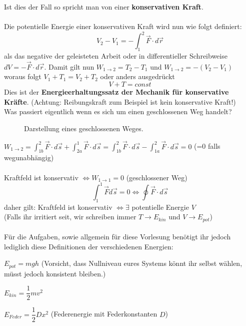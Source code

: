 \documentclass[12pt]{article}
\begin{document}
Ist dies der Fall so spricht man von einer \textbf{konservativen Kraft}.
\\
\\
Die potentielle Energie einer konservativen Kraft wird nun wie folgt definiert:
\begin{equation}
V_2 - V_1 = -\int_{1}^2 \vec{F}\cdot d\vec{r}
\end{equation}
als das negative der geleisteten Arbeit oder in differentieller Schreibweise $dV = -\vec{F} \cdot d\vec{r}$.
Damit gilt nun $W_{1 \rightarrow 2} = T_2-T_1$ und $W_{1 \rightarrow 2} = -(V_2-V_1)$ woraus folgt $V_1+T_1 = V_2+T_2$ oder anders ausgedrückt
\begin{equation}
V+T = const
\end{equation}
Dies ist der \textbf{Energieerhaltungssatz der Mechanik für konservative Kräfte}. (Achtung: Reibungskraft zum Beispiel ist kein konservative Kraft!)
\\
Was passiert eigentlich wenn es sich um einen geschlossenen Weg handelt?
\begin{figure}[H]
  \caption{Darstellung eines geschlossenen Weges.}
  \label{fig:1teil}
\end{figure}
$W_{1 \rightarrow 2} = \int_{1b}^2 \vec{F} \cdot d\vec{s} + \int_{2a}^1 \vec{F} \cdot d\vec{s} = \int_{1b}^2 \vec{F} \cdot d\vec{s} - \int_{1a}^2 \vec{F} \cdot d\vec{s} = 0$ (=0 falls wegunabhängig)\\
\\ Kraftfeld ist konservativ $\Leftrightarrow W_{1 \rightarrow 1} = 0$ (geschlossener Weg)
\begin{equation}
\int_1^1 \vec{F} d\vec{s} = 0 \Leftrightarrow \oint \vec{F} \cdot d\vec{s}
\end{equation}
daher gilt: Kraftfeld ist konservativ $\Leftrightarrow \exists$ potentielle Energie $V$\\
(Falls ihr irritiert seit, wir schreiben immer $T \rightarrow E_{kin}$ und $V \rightarrow E_{pot}$)\\
\\
Für die Aufgaben, sowie allgemein für diese Vorlesung benötigt ihr jedoch lediglich diese Definitionen der verschiedenen Energien:
\begin{itemize}
$E_{pot} = mgh$ (Vorsicht, dass Nullniveau eures Systems könnt ihr selbst wählen, müsst jedoch konsistent bleiben.)
\end{itemize}
\begin{itemize}
$E_{kin} = \dfrac{1}{2}mv^2$
\end{itemize}
\begin{itemize}
$E_{Feder} = \dfrac{1}{2}Dx^2$ (Federenergie mit Federkonstanten $D$)
\end{itemize}
\end{document}
